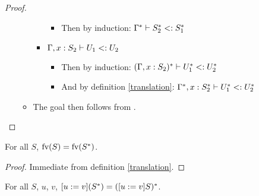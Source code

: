 \begin{proof}
\begin{itemize}
\begin{itemize}
\begin{itemize}
                \begin{itemize}
                    \item Then by induction:
                        $\Gamma^{*} \vdash S_2^{*} <: S_1^{*}$
                \end{itemize}
                \item $\Gamma, x: S_2 \vdash U_1 <: U_2$
                \begin{itemize}
                    \item Then by induction: $(\Gamma, x: S_2)^{*} \vdash U_1^{*} <: U_2^{*}$
                    \item And by definition \ref{translation}:
                        $\Gamma^{*}, x:
                        S_2^{*} \vdash U_1^{*} <: U_2^{*}$
                \end{itemize}
            \end{itemize}
            \item The goal then follows from .
        \end{itemize}
    \end{itemize}
\end{proof}

\begin{LEMMA}
    \label{pres_fv}
    For all $S$, $\text{fv}(S) = \text{fv}(S^{*})$.
\end{LEMMA}

\begin{proof}
    Immediate from definition \ref{translation}.
\end{proof}

\begin{LEMMA}
    \label{comm_trans_sub}
    For all $S$, $u$, $v$, $[u := v](S^{*}) = ([u := v]S)^{*}$.
\end{LEMMA}

